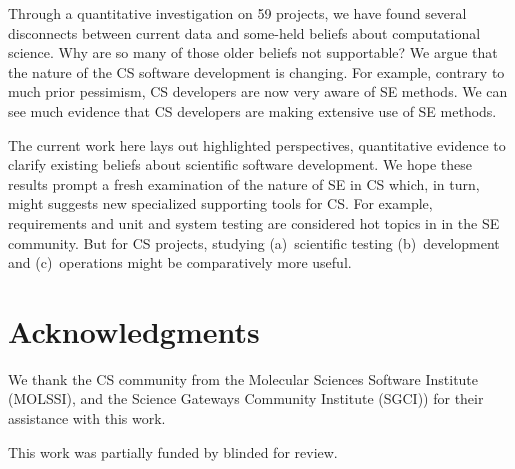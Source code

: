 \documentclass[sigconf,review,anonymous]{acmart}
\begin{document}
Through a quantitative investigation on 59 projects, we have found several disconnects between current data
and some-held beliefs about computational science.
Why are so many of those older beliefs not supportable?
We argue that  the  nature of the CS software development is changing. 
For example, contrary to much prior pessimism,
CS developers are now very
aware of SE methods. 
We can see much evidence that CS developers are making
extensive use of SE methods.

 
 The current work here lays out highlighted perspectives, quantitative evidence to clarify existing beliefs about scientific software development.
 We hope these results  prompt a fresh examination of the nature of SE in  CS which, in turn, might suggests 
  new   specialized supporting tools for CS.
For example, requirements and unit and system testing  are considered hot topics in in the SE community.
But for CS projects,   studying  (a)~scientific testing (b)~development and
(c)~operations might be comparatively more useful.





\section{Acknowledgments}

We thank the   CS community
from the Molecular Sciences Software Institute (MOLSSI), and the Science Gateways Community Institute (SGCI)) for
their assistance with this work.


This work was partially funded by 
blinded for review.

\balance


\end{document}
